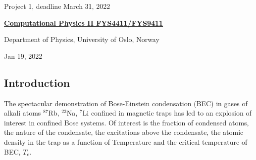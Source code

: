 \documentclass[%
oneside,                 %
final,                   %
10pt]{article}
\begin{document}

\newcommand{\exercisesection}[1]{\subsection*{#1}}






\thispagestyle{empty}

\begin{center}
{\LARGE\bf
\begin{spacing}{1.25}
Project 1, deadline  March 31, 2022 
\end{spacing}
}
\end{center}


\begin{center}
{\bf \href{{http://www.uio.no/studier/emner/matnat/fys/FYS4411/index-eng.html}}{Computational Physics II FYS4411/FYS9411}}
\end{center}

    \begin{center}
\centerline{{\small Department of Physics, University of Oslo, Norway}}
\end{center}
    

\begin{center}
Jan 19, 2022
\end{center}

\vspace{1cm}


\subsection*{Introduction}

 The spectacular demonstration of Bose-Einstein condensation (BEC) in gases of
 alkali atoms $^{87}$Rb, $^{23}$Na, $^7$Li confined in magnetic
 traps has led to an explosion of interest in
 confined Bose systems. Of interest is the fraction of condensed atoms, the
 nature of the condensate, the excitations above the condensate, the atomic
 density in the trap as a function of Temperature and the critical temperature of BEC,
 $T_c$. 
\end{document}
